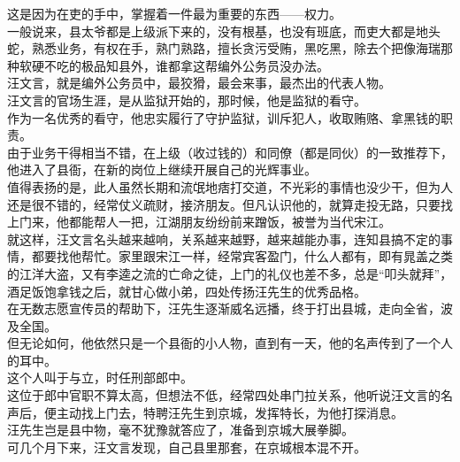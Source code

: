 \begin{multicols}{\theparacolNo}
这是因为在吏的手中，掌握着一件最为重要的东西——权力。\\

一般说来，县太爷都是上级派下来的，没有根基，也没有班底，而吏大都是地头蛇，熟悉业务，有权在手，熟门熟路，擅长贪污受贿，黑吃黑，除去个把像海瑞那种软硬不吃的极品知县外，谁都拿这帮编外公务员没办法。\\

汪文言，就是编外公务员中，最狡猾，最会来事，最杰出的代表人物。\\

汪文言的官场生涯，是从监狱开始的，那时候，他是监狱的看守。\\

作为一名优秀的看守，他忠实履行了守护监狱，训斥犯人，收取贿赂、拿黑钱的职责。\\

由于业务干得相当不错，在上级（收过钱的）和同僚（都是同伙）的一致推荐下，他进入了县衙，在新的岗位上继续开展自己的光辉事业。\\

值得表扬的是，此人虽然长期和流氓地痞打交道，不光彩的事情也没少干，但为人还是很不错的，经常仗义疏财，接济朋友。但凡认识他的，就算走投无路，只要找上门来，他都能帮人一把，江湖朋友纷纷前来蹭饭，被誉为当代宋江。\\

就这样，汪文言名头越来越响，关系越来越野，越来越能办事，连知县搞不定的事情，都要找他帮忙。家里跟宋江一样，经常宾客盈门，什么人都有，即有晁盖之类的江洋大盗，又有李逵之流的亡命之徒，上门的礼仪也差不多，总是“叩头就拜”，酒足饭饱拿钱之后，就甘心做小弟，四处传扬汪先生的优秀品格。\\

在无数志愿宣传员的帮助下，汪先生逐渐威名远播，终于打出县城，走向全省，波及全国。\\

但无论如何，他依然只是一个县衙的小人物，直到有一天，他的名声传到了一个人的耳中。\\

这个人叫于与立，时任刑部郎中。\\

这位于郎中官职不算太高，但想法不低，经常四处串门拉关系，他听说汪文言的名声后，便主动找上门去，特聘汪先生到京城，发挥特长，为他打探消息。\\

汪先生岂是县中物，毫不犹豫就答应了，准备到京城大展拳脚。\\

可几个月下来，汪文言发现，自己县里那套，在京城根本混不开。\\


\end{multicols}
